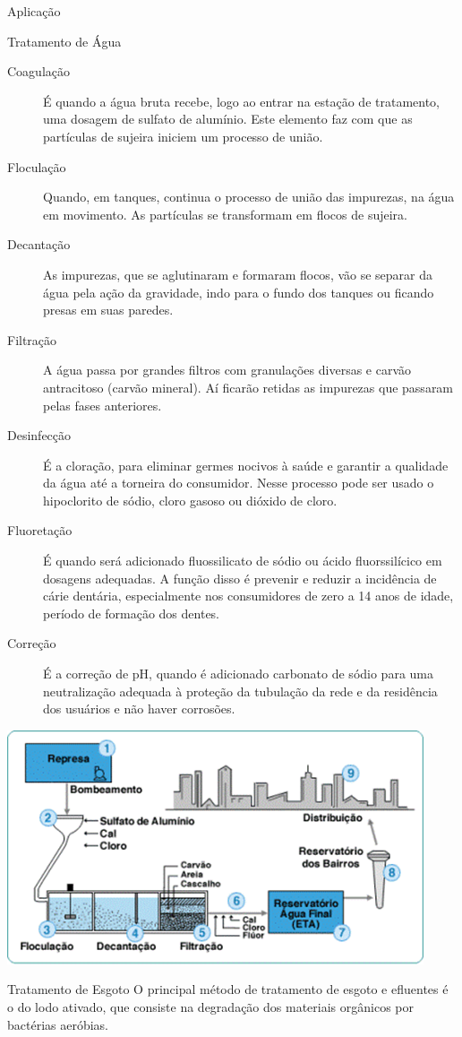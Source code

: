 \documentclass{beamer}
\begin{document}
\begin{frame}[label={sec:orgbc093dc}]{Aplicação}
\begin{block}{Tratamento de Água}
\begin{description}
\item[{Coagulação}] É quando a água bruta recebe, logo ao entrar na estação de tratamento, uma dosagem de sulfato de alumínio. Este elemento faz com que as partículas de sujeira iniciem um processo de união.
\item[{Floculação}] Quando, em tanques, continua o processo de união das impurezas, na água em movimento. As partículas se transformam em flocos de sujeira.
\item[{Decantação}] As impurezas, que se aglutinaram e formaram flocos, vão se separar da água pela ação da gravidade, indo para o fundo dos tanques ou ficando presas em suas paredes.
\item[{Filtração}] A água passa por grandes filtros com granulações diversas e carvão antracitoso (carvão mineral). Aí ficarão retidas as impurezas que passaram pelas fases anteriores.
\item[{Desinfecção}] É a cloração, para eliminar germes nocivos à saúde e garantir a qualidade da água até a torneira do consumidor. Nesse processo pode ser usado o hipoclorito de sódio, cloro gasoso ou dióxido de cloro.
\item[{Fluoretação}] É quando será adicionado fluossilicato de sódio ou ácido fluorssilícico em dosagens adequadas. A função disso é prevenir e reduzir a incidência de cárie dentária, especialmente nos consumidores de zero a 14 anos de idade, período de formação dos dentes.
\item[{Correção}] É a correção de pH, quando é adicionado carbonato de sódio para uma neutralização adequada à proteção da tubulação da rede e da residência dos usuários e não haver corrosões.
\end{description}

\begin{center}
\includegraphics[width=.9\linewidth]{../img/estacao_agua.png}
\end{center}
\end{block}
\begin{block}{Tratamento de Esgoto}
O principal método de tratamento de esgoto e efluentes é o do lodo ativado, que consiste na degradação dos materiais orgânicos por bactérias aeróbias.



\end{block}
\end{frame}
\end{document}
